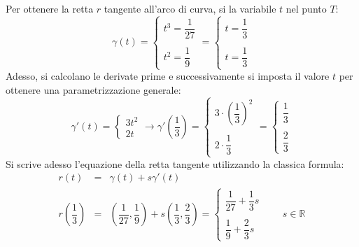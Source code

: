 \documentclass[a4paper]{article}
\begin{document}
	\noindent
	Per ottenere la retta $r$ tangente all'arco di curva, si la variabile $t$ nel punto $T$:
	\begin{equation*}
		\gamma\left(t\right) 
		=
		\begin{cases}
			t^{3} = \dfrac{1}{27} \\ \\
			t^{2} = \dfrac{1}{9}
		\end{cases}
		=
		\begin{cases}
			t = \dfrac{1}{3} \\ \\
			t = \dfrac{1}{3}
		\end{cases}
	\end{equation*}
	Adesso, si calcolano le derivate prime e successivamente si imposta il valore $t$ per ottenere una parametrizzazione generale:
	\begin{equation*}
		\gamma'\left(t\right) 
		= 
		\begin{cases}
			3t^{2} \\
			2t
		\end{cases} 
		\rightarrow
		\gamma'\left(\frac{1}{3}\right)
		=
		\begin{cases}
			3 \cdot \left(\dfrac{1}{3}\right)^{2} \\ \\
			2 \cdot \dfrac{1}{3}
		\end{cases}
		=
		\begin{cases}
			\dfrac{1}{3} \\ \\
			\dfrac{2}{3}
		\end{cases}
	\end{equation*}
	Si scrive adesso l'equazione della retta tangente utilizzando la classica formula:
	\begin{equation*}
		\begin{array}{rcl}
			r\left(t\right) &=& \gamma\left(t\right) + s\gamma'\left(t\right) \\ [1em]
			r\left(\dfrac{1}{3}\right) &=& \left(\dfrac{1}{27}, \dfrac{1}{9}\right) + s\left(\dfrac{1}{3}, \dfrac{2}{3}\right)
			=
			\begin{cases}
				\dfrac{1}{27} + \dfrac{1}{3}s \\ \\
				\dfrac{1}{9} + \dfrac{2}{3}s
			\end{cases}
			\hspace{2em}
			s \in \mathbb{R}
		\end{array}
	\end{equation*}
\end{document}

